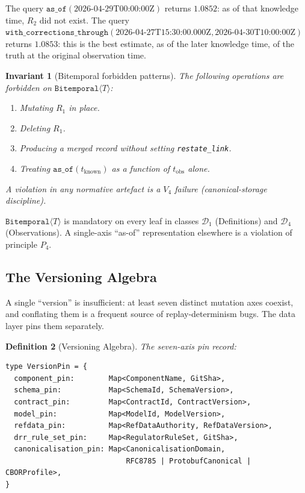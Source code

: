 \documentclass[11pt,a4paper]{article}
\newtheorem{definition}{Definition}[section]
\newtheorem{invariant}[definition]{Invariant}
\begin{document}
The query $\texttt{as\_of}(\text{2026-04-29T00:00:00Z})$ returns $1.0852$: as of that knowledge time, $R_2$ did not exist. The query $\texttt{with\_corrections\_through}(\text{2026-04-27T15:30:00.000Z}, \text{2026-04-30T10:00:00Z})$ returns $1.0853$: this is the best estimate, as of the later knowledge time, of the truth at the original observation time.

\begin{invariant}[Bitemporal forbidden patterns]
\label{inv:bitemporal-forbidden}
The following operations are forbidden on $\texttt{Bitemporal}\langle T \rangle$:
\begin{enumerate}[nosep]
\item Mutating $R_1$ in place.
\item Deleting $R_1$.
\item Producing a merged record without setting \texttt{restate\_link}.
\item Treating $\texttt{as\_of}(t_{\mathrm{known}})$ as a function of $t_{\mathrm{obs}}$ alone.
\end{enumerate}
A violation in any normative artefact is a $V_4$ failure (canonical-storage discipline).
\end{invariant}

$\texttt{Bitemporal}\langle T \rangle$ is mandatory on every leaf in classes $\mathcal{D}_1$ (Definitions) and $\mathcal{D}_4$ (Observations). A single-axis ``as-of'' representation elsewhere is a violation of principle $P_4$.

\subsection{The Versioning Algebra}
\label{sec:bitemporal-versioning}

A single ``version'' is insufficient: at least seven distinct mutation axes coexist, and conflating them is a frequent source of replay-determinism bugs. The data layer pins them separately.

\begin{definition}[Versioning Algebra]
\label{def:version-pin}
The seven-axis pin record:
\begin{lstlisting}
type VersionPin = {
  component_pin:        Map<ComponentName, GitSha>,
  schema_pin:           Map<SchemaId, SchemaVersion>,
  contract_pin:         Map<ContractId, ContractVersion>,
  model_pin:            Map<ModelId, ModelVersion>,
  refdata_pin:          Map<RefDataAuthority, RefDataVersion>,
  drr_rule_set_pin:     Map<RegulatorRuleSet, GitSha>,
  canonicalisation_pin: Map<CanonicalisationDomain,
                            RFC8785 | ProtobufCanonical | CBORProfile>,
}
\end{lstlisting}
\end{definition}
\end{document}
